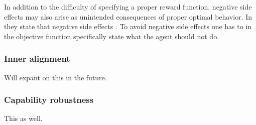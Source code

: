 \documentclass[12pt,A4]{report}
\theoremstyle{definition}
\begin{document}

In addition to the difficulty of specifying a proper reward function, negative side effects may also arise as unintended consequences of proper optimal behavior. In \autocite{Saisubramanian et al} they state that negative side effects . To avoid negative side effects one has to in the objective function specifically state what the agent should not do.

\subsubsection{Inner alignment}
Will expant on this in the future.

\subsubsection{Capability robustness}
This as well.

\end{document}
